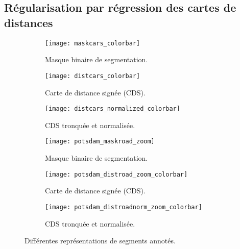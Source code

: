 \subsection{Régularisation par régression des cartes de distances}
\begin{figure}[!t]
    \begin{subfigure}{0.33\textwidth}
    	\texttt{[image: maskcars\_colorbar]}
        \caption{Masque binaire de segmentation.}
    \end{subfigure}
    \begin{subfigure}{0.33\textwidth}
    	\texttt{[image: distcars\_colorbar]}
        \caption{Carte de distance signée (CDS).}
    \end{subfigure}
    \begin{subfigure}{0.33\textwidth}
    	\texttt{[image: distcars\_normalized\_colorbar]}
        \caption{CDS tronquée et normalisée.}
    \end{subfigure}

	\begin{subfigure}{0.33\textwidth}
    	\texttt{[image: potsdam\_maskroad\_zoom]}
        \caption{Masque binaire de segmentation.}
    \end{subfigure}
    \begin{subfigure}{0.33\textwidth}
    	\texttt{[image: potsdam\_distroad\_zoom\_colorbar]}
        \caption{Carte de distance signée (CDS).}
    \end{subfigure}
    \begin{subfigure}{0.33\textwidth}
    	\texttt{[image: potsdam\_distroadnorm\_zoom\_colorbar]}
        \caption{CDS tronquée et normalisée.}
    \end{subfigure}
    \caption{Différentes représentations de segments annotés.}
    \label{fig:representations}
\end{figure}

